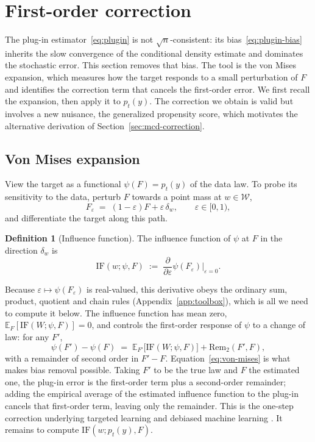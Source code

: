\documentclass[11pt]{article}
\theoremstyle{plain}
\theoremstyle{definition}
\newtheorem{mydef}{Definition}
\theoremstyle{remark}
\newcommand{\pE}{\ensuremath{\mathbb{E}}}
\newcommand{\cW}{\ensuremath{\mathcal{W}}}
\newcommand{\IF}{\mathrm{IF}}
\newcommand{\Rem}{\mathrm{Rem}}
\begin{document}
\section{First-order correction}
\label{sec:eif}

The plug-in estimator~\eqref{eq:plugin} is not $\sqrt{n}$-consistent: its
bias~\eqref{eq:plugin-bias} inherits the slow convergence of the conditional density
estimate and dominates the stochastic error. This section removes that bias. The tool is
the von Mises expansion, which measures how the target responds to a small perturbation of
$F$ and identifies the correction term that cancels the first-order error. We first recall
the expansion, then apply it to $p_t(y)$. The correction we obtain is valid but involves a
new nuisance, the generalized propensity score, which motivates the alternative derivation
of Section~\ref{sec:mcd-correction}.

\subsection{Von Mises expansion}
\label{sec:eif-vm}

View the target as a functional $\psi(F) = p_t(y)$ of the data law. To probe its
sensitivity to the data, perturb $F$ towards a point mass at $w \in \cW$,
\begin{equation}
F_\varepsilon \;=\; (1-\varepsilon)F + \varepsilon\,\delta_w ,
\qquad \varepsilon \in [0,1),
\label{eq:perturbation}
\end{equation}
and differentiate the target along this path.

\begin{mydef}[Influence function]
\label{def:if}
The influence function of $\psi$ at $F$ in the direction $\delta_w$ is
\begin{equation}
\IF(w;\psi,F) \;:=\;
\frac{\partial}{\partial \varepsilon} \psi(F_\varepsilon)\Big|_{\varepsilon=0} .
\label{eq:if-def}
\end{equation}
\end{mydef}

Because $\varepsilon \mapsto \psi(F_\varepsilon)$ is real-valued, this derivative obeys the
ordinary sum, product, quotient and chain rules (Appendix~\ref{app:toolbox}), which is all
we need to compute it below. The influence function has mean zero,
$\pE_F[\IF(W;\psi,F)] = 0$, and controls the first-order response of $\psi$ to a change of
law: for any $F'$,
\begin{equation}
\psi(F') - \psi(F)
\;=\; \pE_{F'}\big[\IF(W;\psi,F)\big] + \Rem_2(F',F),
\label{eq:von-mises}
\end{equation}
with a remainder of second order in $F'-F$. Equation~\eqref{eq:von-mises} is what makes
bias removal possible. Taking $F'$ to be the true law and $F$ the estimated one, the
plug-in error is the first-order term plus a second-order remainder; adding the empirical
average of the estimated influence function to the plug-in cancels that first-order term,
leaving only the remainder. This is the one-step correction
\citep{bickel1993,vandervaart1998} underlying targeted learning \citep{vanderlaan2006tmle}
and debiased machine learning \citep{chernozhukov2018}. It remains to compute
$\IF(w;p_t(y),F)$.
\end{document}
